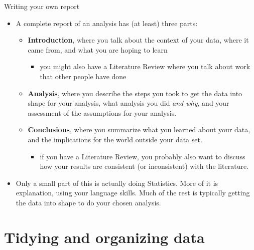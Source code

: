\documentclass[
  ignorenonframetext,
]{beamer}
\providecommand{\tightlist}{%
  \setlength{\itemsep}{0pt}\setlength{\parskip}{0pt}}
\begin{document}
\begin{frame}{Writing your own report}
\protect\hypertarget{writing-your-own-report}{}

\begin{itemize}
\tightlist
\item
  A complete report of an analysis has (at least) three parts:

  \begin{itemize}
  \tightlist
  \item
    \textbf{Introduction}, where you talk about the context of your
    data, where it came from, and what you are hoping to learn

    \begin{itemize}
    \tightlist
    \item
      you might also have a Literature Review where you talk about work
      that other people have done
    \end{itemize}
  \item
    \textbf{Analysis}, where you describe the steps you took to get the
    data into shape for your analysis, what analysis you did \emph{and
    why}, and your assessment of the assumptions for your analysis.
  \item
    \textbf{Conclusions}, where you summarize what you learned about
    your data, and the implications for the world outside your data set.

    \begin{itemize}
    \tightlist
    \item
      if you have a Literature Review, you probably also want to discuss
      how your results are consistent (or inconsistent) with the
      literature.
    \end{itemize}
  \end{itemize}
\item
  Only a small part of this is actually doing Statistics. More of it is
  explanation, using your language skills. Much of the rest is typically
  getting the data into shape to do your chosen analysis.
\end{itemize}

\end{frame}

\hypertarget{tidying-and-organizing-data}{%
\section{Tidying and organizing
data}\label{tidying-and-organizing-data}}
\end{document}
